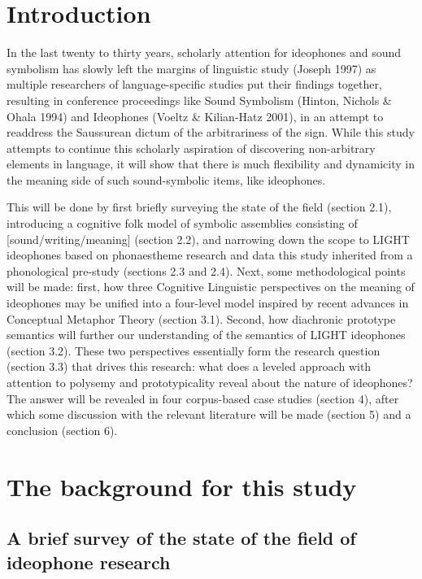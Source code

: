 \setlength{\parindent}{1cm} %
\setlength{\parskip}{0em} %

\section{Introduction}\label{introduction}

In the last twenty to thirty years, scholarly attention for ideophones
and sound symbolism has slowly left the margins of linguistic study
(Joseph 1997) as multiple researchers of language-specific studies put
their findings together, resulting in conference proceedings like Sound
Symbolism (Hinton, Nichols \& Ohala 1994) and Ideophones (Voeltz \&
Kilian-Hatz 2001), in an attempt to readdress the Saussurean dictum of
the arbitrariness of the sign. While this study attempts to continue
this scholarly aspiration of discovering non-arbitrary elements in
language, it will show that there is much flexibility and dynamicity in
the meaning side of such sound-symbolic items, like ideophones.

This will be done by first briefly surveying the state of the field
(section 2.1), introducing a cognitive folk model of symbolic assemblies
consisting of {[}sound/writing/meaning{]} (section 2.2), and narrowing
down the scope to LIGHT ideophones based on phonaestheme research and
data this study inherited from a phonological pre-study (sections 2.3
and 2.4). Next, some methodological points will be made: first, how
three Cognitive Linguistic perspectives on the meaning of ideophones may
be unified into a four-level model inspired by recent advances in
Conceptual Metaphor Theory (section 3.1). Second, how diachronic
prototype semantics will further our understanding of the semantics of
LIGHT ideophones (section 3.2). These two perspectives essentially form
the research question (section 3.3) that drives this research: what does
a leveled approach with attention to polysemy and prototypicality reveal
about the nature of ideophones? The answer will be revealed in four
corpus-based case studies (section 4), after which some discussion with
the relevant literature will be made (section 5) and a conclusion
(section 6).

\section{The background for this
study}\label{the-background-for-this-study}

\subsection{A brief survey of the state of the field of ideophone
research}\label{a-brief-survey-of-the-state-of-the-field-of-ideophone-research}

